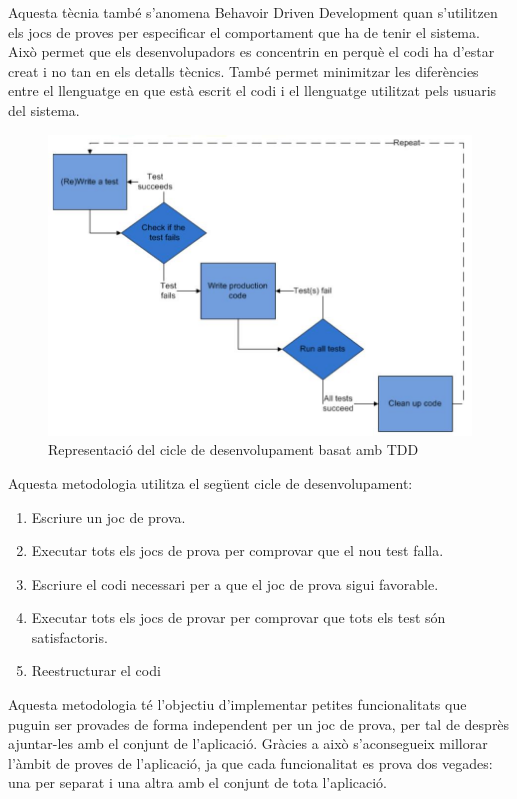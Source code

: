 Aquesta tècnia també s'anomena Behavoir Driven Development quan s'utilitzen els jocs de proves per especificar el comportament que ha de tenir el sistema. Això permet que els desenvolupadors es concentrin en perquè el codi ha d'estar creat i no tan en els detalls tècnics. També permet minimitzar les diferències entre el llenguatge en que està escrit el codi i el llenguatge utilitzat pels usuaris del sistema.


\begin{figure}[htbp]
\centering\includegraphics[width=12cm]{img/ttd1.jpg}
\caption{Representació del cicle de desenvolupament basat amb TDD}
\label{fig:tdd}
\end{figure} 

\newpage

Aquesta metodologia utilitza el següent cicle de desenvolupament: 

\begin{enumerate}
    \item{Escriure un joc de prova.}
    \item{Executar tots els jocs de prova per comprovar que el nou test falla.}
    \item{Escriure el codi necessari per a que el joc de prova sigui favorable.}
    \item{Executar tots els jocs de provar per comprovar que tots els test són satisfactoris.}
    \item{Reestructurar el codi}
\end{enumerate}

Aquesta metodologia té l'objectiu d'implementar petites funcionalitats que puguin ser provades de forma independent per un joc de prova, per tal de desprès ajuntar-les amb el conjunt de l'aplicació. Gràcies a això s'aconsegueix millorar l'àmbit de proves de l'aplicació, ja que cada funcionalitat es prova dos vegades: una per separat i una altra amb el conjunt de tota l'aplicació. 


